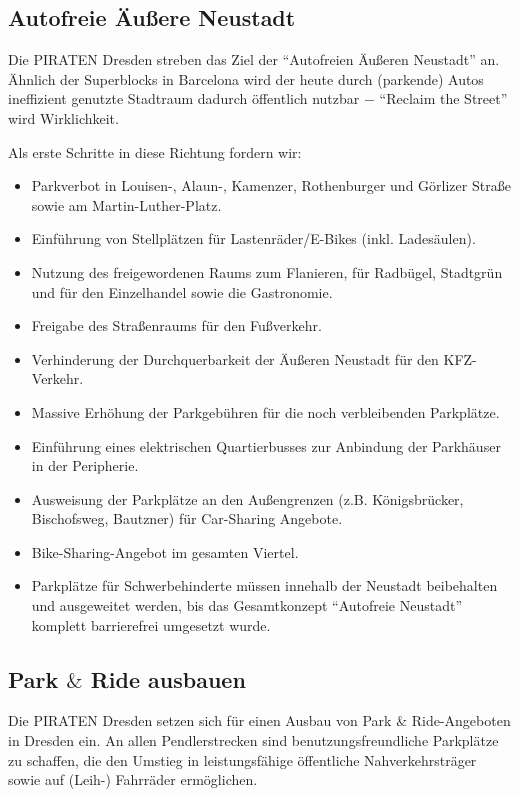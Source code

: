 \documentclass[a4paper, 11pt]{article}
\begin{document}
\subsection{Autofreie Äußere Neustadt}
Die PIRATEN Dresden streben das Ziel der ``Autofreien Äußeren Neustadt'' an. Ähnlich der Superblocks in Barcelona wird der heute durch (parkende) Autos ineffizient genutzte Stadtraum dadurch öffentlich nutzbar $-$ ``Reclaim the Street'' wird Wirklichkeit.\newline

Als erste Schritte in diese Richtung fordern wir:

\begin{itemize}
    \item Parkverbot in Louisen-, Alaun-, Kamenzer, Rothenburger und Görlizer Straße sowie am Martin-Luther-Platz.
    \item  Einführung von Stellplätzen für Lastenräder/E-Bikes (inkl. Ladesäulen).
    \item  Nutzung des freigewordenen Raums zum Flanieren, für Radbügel, Stadtgrün und für den Einzelhandel sowie die Gastronomie.
    \item  Freigabe des Straßenraums für den Fußverkehr.
    \item  Verhinderung der Durchquerbarkeit der Äußeren Neustadt für den KFZ-Verkehr.
    \item  Massive Erhöhung der Parkgebühren für die noch verbleibenden Parkplätze.
    \item  Einführung eines elektrischen Quartierbusses zur Anbindung der Parkhäuser in der Peripherie.
    \item  Ausweisung der Parkplätze an den Außengrenzen (z.B. Königsbrücker, Bischofsweg, Bautzner) für Car-Sharing Angebote.
    \item Bike-Sharing-Angebot im gesamten Viertel.
    \item Parkplätze für Schwerbehinderte müssen innehalb der Neustadt beibehalten und ausgeweitet werden, bis das Gesamtkonzept ``Autofreie Neustadt'' komplett barrierefrei umgesetzt wurde.
\end{itemize}


\subsection{Park $\&$ Ride ausbauen}
Die PIRATEN Dresden setzen sich für einen Ausbau von Park $\&$ Ride-Angeboten in Dresden ein. An allen Pendlerstrecken sind benutzungsfreundliche Parkplätze zu schaffen, die den Umstieg in leistungsfähige öffentliche Nahverkehrsträger sowie auf (Leih-) Fahrräder ermöglichen.
\end{document}
